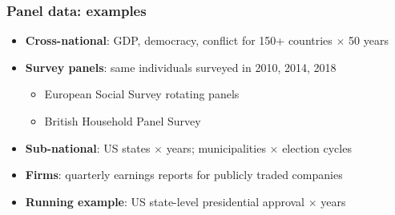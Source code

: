 \begin{frame}
\frametitle{Panel data: examples}
\centering

\begin{itemize}[<+->]
\item \textbf{Cross-national}: GDP, democracy, conflict for 150+ countries $\times$ 50 years
\vspace{8pt}
\item \textbf{Survey panels}: same individuals surveyed in 2010, 2014, 2018
  \begin{itemize}
  \item European Social Survey rotating panels
  \item British Household Panel Survey
  \end{itemize}
\vspace{8pt}
\item \textbf{Sub-national}: US states $\times$ years; municipalities $\times$ election cycles
\vspace{8pt}
\item \textbf{Firms}: quarterly earnings reports for publicly traded companies
\vspace{8pt}
\item \textbf{Running example}: US state-level presidential approval $\times$ years
\end{itemize}

\end{frame}

